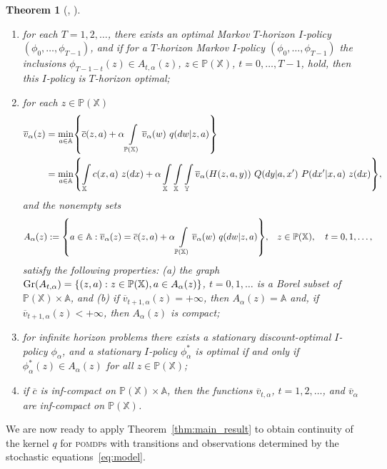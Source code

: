 \documentclass[11pt,onecolumn]{IEEEtran}  %
\newcommand{\Ab}{\mathbb{A}}
\newcommand{\Pb}{\mathbb{P}}
\newcommand{\Xb}{\mathbb{X}}
\newcommand{\Yb}{\mathbb{Y}}
\renewcommand{\bar}{\overline}
\newcommand{\defeq}{:=}%
\newcommand{\pomdp}{\textsc{pomdp}}
\DeclareMathOperator{\Gr}{\mathrm{Gr}}
\DeclarePairedDelimiter{\set}{\{}{\}}
\newtheorem{theorem}{Theorem}
\theoremstyle{definition}
\begin{document}
\begin{theorem}[{\citet[Theorem 2]{feinberg_average_cost_2012}, \cite[Theorem 3.1]{feinberg_partially_2016}}]
\begin{enumerate}
        \item for each $T = 1, 2, \dots$, there exists an optimal Markov $T$-horizon $I$-policy $(\phi_0, \dots, \phi_{T-1})$, and if for a $T$-horizon Markov $I$-policy $(\phi_0, \dots, \phi_{T-1})$ the inclusions $\phi_{T-1-t}(z) \in A_{t,\alpha}(z)$, $z \in \Pb(\Xb)$, $t=0,\dots, T-1$, hold, then this $I$-policy is $T$-horizon optimal;
        \item for each $z \in \Pb(\Xb)$
        \begin{align*}
            \bar v_{\alpha}(z) &=
            \min_{a \in \Ab} \set*{
                \bar c (z,a) + \alpha \int\limits_{\Pb(\Xb)} \bar v_{\alpha}(w) \ q(dw|z,a)
            } \\ &=
            \min_{a \in \Ab} \set*{
                \int\limits_{\Xb} c(x,a) \ z(dx) + \alpha
                \int\limits_{\Xb}\int\limits_{\Xb} \int\limits_{\Yb} \bar v_{\alpha} (H(z,a,y)) \ Q(dy|a,x') \ P(dx'|x,a) \ z(dx)
            },
        \end{align*}
        and the nonempty sets
        \begin{align*}
            A_{\alpha}(z) &\defeq \set*{
                a \in \Ab : \bar v_{\alpha}(z) = \bar c(z,a) + \alpha \int\limits_{\Pb(\Xb)} \bar v_{\alpha}(w) \ q(dw|z,a)
            },  &&
            z \in \Pb(\Xb), \quad
            t=0,1,\dots,
        \end{align*}
        satisfy the following properties: (a) the graph $\Gr(A_{t,\alpha}) = \set{(z,a) : z \in \Pb(\Xb), a \in A_{\alpha}(z)}$, $t=0,1,\dots$ is a Borel subset of $\Pb(\Xb) \times \Ab$, and (b) if $\bar v_{t+1,\alpha}(z) = +\infty$, then $A_{\alpha}(z) = \Ab$ and, if $\bar v_{t+1,\alpha}(z) < +\infty$, then $A_{\alpha}(z)$ is compact;
        \item for infinite horizon problems there exists a stationary discount-optimal $I$-policy $\phi_\alpha$, and a stationary $I$-policy $\phi_\alpha^*$ is optimal if and only if $\phi_\alpha^*(z) \in A_{\alpha}(z)$ for all $z \in \Pb(\Xb)$;
        \item if $\bar c$ is inf-compact on $\Pb(\Xb) \times \Ab$, then the functions $\bar v_{t,\alpha}$, $t=1,2,\dots$, and $\bar v_\alpha$ are inf-compact on $\Pb(\Xb)$.
    \end{enumerate}
\end{theorem}

We are now ready to apply Theorem~\ref{thm:main_result} to obtain continuity of the kernel $q$ for \pomdp{}s with transitions and observations determined by the stochastic equations~\eqref{eq:model}.
\end{document}
